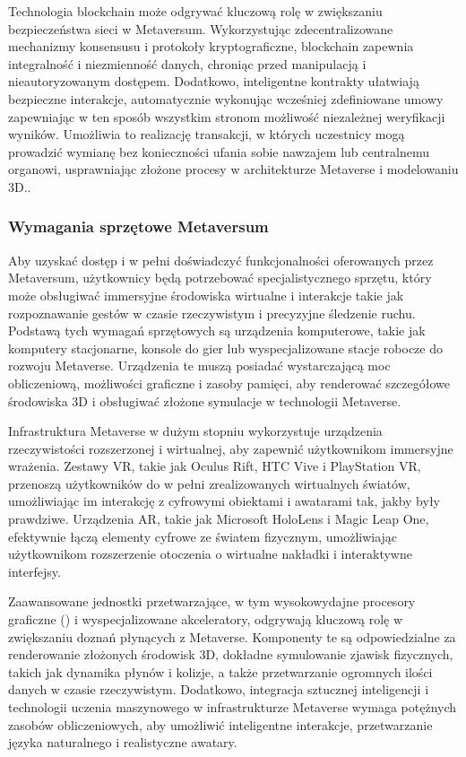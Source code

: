 Technologia blockchain może odgrywać kluczową rolę w zwiększaniu bezpieczeństwa sieci w Metaversum. Wykorzystując zdecentralizowane mechanizmy konsensusu i protokoły kryptograficzne, blockchain zapewnia integralność i niezmienność danych, chroniąc przed manipulacją i nieautoryzowanym dostępem. Dodatkowo, inteligentne kontrakty ułatwiają bezpieczne interakcje, automatycznie wykonując wcześniej zdefiniowane umowy zapewniając w ten sposób wszystkim stronom możliwość niezależnej weryfikacji wyników. Umożliwia to realizację transakcji, w których uczestnicy mogą prowadzić wymianę bez konieczności ufania sobie nawzajem lub centralnemu organowi, usprawniając złożone procesy w architekturze Metaverse i modelowaniu 3D.\cite{metaverseInfrastructureIEEE}.

\subsubsection{Wymagania sprzętowe Metaversum}

Aby uzyskać dostęp i w pełni doświadczyć funkcjonalności oferowanych przez Metaversum, użytkownicy będą potrzebować specjalistycznego sprzętu, który może obsługiwać immersyjne środowiska wirtualne i interakcje takie jak rozpoznawanie gestów w czasie rzeczywistym i precyzyjne śledzenie ruchu. Podstawą tych wymagań sprzętowych są urządzenia komputerowe, takie jak komputery stacjonarne, konsole do gier lub wyspecjalizowane stacje robocze do rozwoju Metaverse. Urządzenia te muszą posiadać wystarczającą moc obliczeniową, możliwości graficzne i zasoby pamięci, aby renderować szczegółowe środowiska 3D i obsługiwać złożone symulacje w technologii Metaverse\cite{metaverseInfrastructureIEEE}.

Infrastruktura Metaverse w dużym stopniu wykorzystuje urządzenia rzeczywistości rozszerzonej i wirtualnej, aby zapewnić użytkownikom immersyjne wrażenia. Zestawy VR, takie jak Oculus Rift, HTC Vive i PlayStation VR, przenoszą użytkowników do w pełni zrealizowanych wirtualnych światów, umożliwiając im interakcję z cyfrowymi obiektami i awatarami tak, jakby były prawdziwe. Urządzenia AR, takie jak Microsoft HoloLens i Magic Leap One, efektywnie łączą elementy cyfrowe ze światem fizycznym, umożliwiając użytkownikom rozszerzenie otoczenia o wirtualne nakładki i interaktywne interfejsy\cite{metaverseInfrastructureIEEE}.

Zaawansowane jednostki przetwarzające, w tym wysokowydajne procesory graficzne  () i wyspecjalizowane akceleratory, odgrywają kluczową rolę w zwiększaniu doznań płynących z Metaverse. Komponenty te są odpowiedzialne za renderowanie złożonych środowisk 3D, dokładne symulowanie zjawisk fizycznych, takich jak dynamika płynów i kolizje, a także przetwarzanie ogromnych ilości danych w czasie rzeczywistym. Dodatkowo, integracja sztucznej inteligencji i technologii uczenia maszynowego w infrastrukturze Metaverse wymaga potężnych zasobów obliczeniowych, aby umożliwić inteligentne interakcje, przetwarzanie języka naturalnego i realistyczne awatary\cite{metaverseInfrastructureIEEE}.

